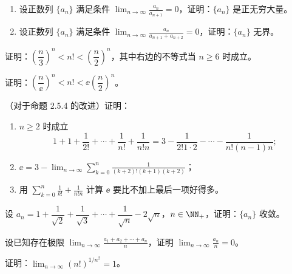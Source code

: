 \begin{xreferenceproblem}[10]
\begin{enumerate}[label=(\arabic*)]
    \item 设正数列 $\{a_n\}$ 满足条件 $\displaystyle\lim_{n\to\infty}\frac{a_n}{a_{n+1}}=0$，证明：$\{a_n\}$ 是正无穷大量。
    \item 设正数列 $\{a_n\}$ 满足条件 $\displaystyle\lim_{n\to\infty}\frac{a_n}{a_{n+1}+a_{n+2}}=0$，证明：$\{a_n\}$ 无界。
  \end{enumerate}
\end{xreferenceproblem}

\begin{xreferenceproblem}[11]
证明：$\left(\dfrac n3\right)^n<n!<\left(\dfrac n2\right)^n$，其中右边的不等式当 $n\ge6$ 时成立。
\end{xreferenceproblem}

\begin{xreferenceproblem}[12]
证明：$\left(\dfrac n\ee\right)^n<n!<\ee\left(\dfrac n2\right)^n$。
\end{xreferenceproblem}

\begin{xreferenceproblem}[13]
（对于命题 2.5.4 的改进）证明：
  \begin{enumerate}[label=(\arabic*)]
    \item $n\ge2$ 时成立
    \[
      1+1+\frac1{2!}+\cdots+\frac1{n!}+\frac1{n!n}
      =3-\frac1{2!1\cdot2}-\cdots-\frac1{n!(n-1)n};
    \]
    \item $\displaystyle\ee=3-\lim_{n\to\infty}\sum_{k=0}^n\frac1{(k+2)!(k+1)(k+2)}$；
    \item 用 $\displaystyle\sum_{k=0}^n\frac1{k!}+\frac1{n!n}$ 计算 $\ee$ 要比不加上最后一项好得多。
  \end{enumerate}
\end{xreferenceproblem}

\begin{xreferenceproblem}[14]
设 $a_n=1+\dfrac1{\sqrt2}+\dfrac1{\sqrt3}+\cdots+\dfrac1{\sqrt n}-2\sqrt n$，$n\in\NN_+$，证明：$\{a_n\}$ 收敛。
\end{xreferenceproblem}

\begin{xreferenceproblem}[15]
设已知存在极限 $\displaystyle\lim_{n\to\infty}\frac{a_1+a_2+\cdots+a_n}{n}$，证明 $\displaystyle\lim_{n\to\infty}\frac{a_n}{n}=0$。
\end{xreferenceproblem}

\begin{xreferenceproblem}[16]
证明：$\displaystyle\lim_{n\to\infty}(n!)^{1/n^2}=1$。
\end{xreferenceproblem}

